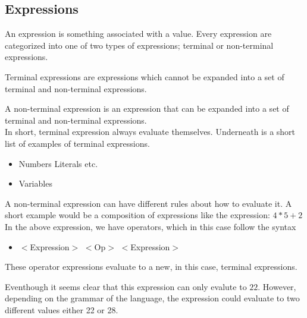 \subsection{Expressions}
An expression is something associated with a value.
Every expression are categorized into one of two types
of expressions; terminal or non-terminal expressions.

Terminal expressions are expressions which cannot be 
expanded into a set of terminal and non-terminal expressions.

A non-terminal expression is an expression that can be 
expanded into a set of terminal and non-terminal expressions. \\

\noindent In short, terminal expression always evaluate themselves.
Underneath is a short list of examples of terminal expressions.
\begin{itemize}
  \item Numbers \textbar{} Literals etc.
  \item Variables
\end{itemize}

\noindent A non-terminal expression can have different rules about how to
evaluate it. A short example would be a composition of expressions
like the expression: $4 * 5 + 2$
In the above expression, we have operators, which in this case follow the
syntax

\begin{itemize}
\item $<$Expression$>$ $<$Op$>$ $<$Expression$>$
\end{itemize}

\noindent These operator expressions evaluate to a new, in this case, terminal 
expressions.

Eventhough it seems clear that this expression can only evalute to $22$. 
However, depending on the grammar of the language, the expression could evaluate to two different values either 22 or 28.

\newpage
